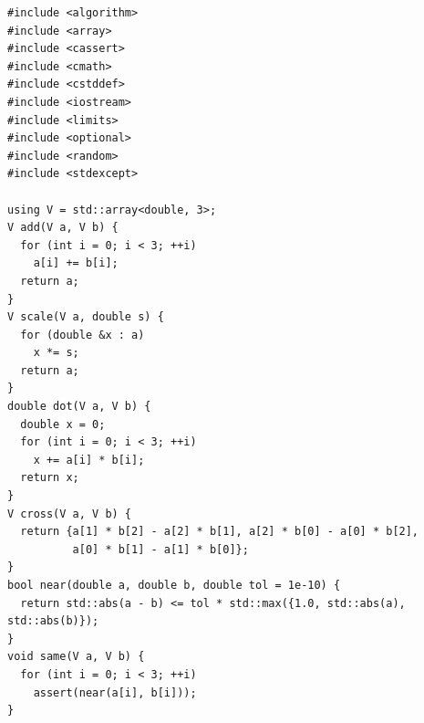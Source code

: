 \begin{verbatim}
#include <algorithm>
#include <array>
#include <cassert>
#include <cmath>
#include <cstddef>
#include <iostream>
#include <limits>
#include <optional>
#include <random>
#include <stdexcept>

using V = std::array<double, 3>;
V add(V a, V b) {
  for (int i = 0; i < 3; ++i)
    a[i] += b[i];
  return a;
}
V scale(V a, double s) {
  for (double &x : a)
    x *= s;
  return a;
}
double dot(V a, V b) {
  double x = 0;
  for (int i = 0; i < 3; ++i)
    x += a[i] * b[i];
  return x;
}
V cross(V a, V b) {
  return {a[1] * b[2] - a[2] * b[1], a[2] * b[0] - a[0] * b[2],
          a[0] * b[1] - a[1] * b[0]};
}
bool near(double a, double b, double tol = 1e-10) {
  return std::abs(a - b) <= tol * std::max({1.0, std::abs(a), std::abs(b)});
}
void same(V a, V b) {
  for (int i = 0; i < 3; ++i)
    assert(near(a[i], b[i]));
}


\end{verbatim}
